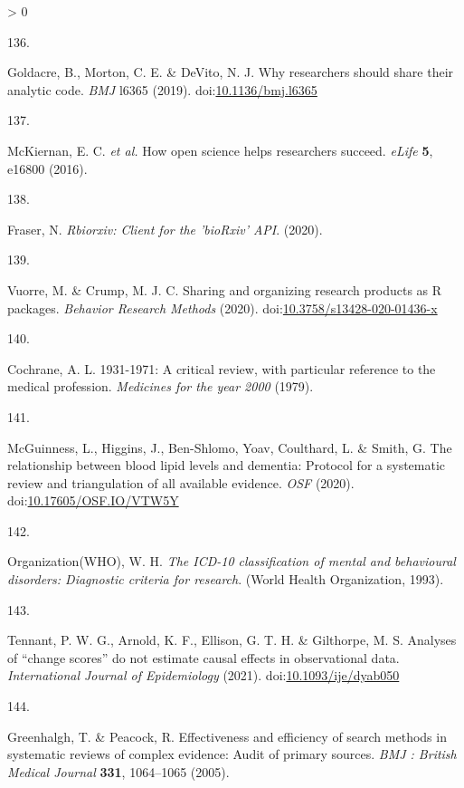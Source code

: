 \documentclass[a4paper, twoside]{templates/ociamthesis}
\newlength{\cslhangindent}
\newlength{\csllabelwidth}
\newenvironment{CSLReferences}[3] %
 {%
  \setlength{\parindent}{0pt}
  \ifodd #1 \everypar{\setlength{\hangindent}{\cslhangindent}}\ignorespaces\fi
  \ifnum #2 > 0
  \setlength{\parskip}{#2\baselineskip}
  \fi
 }%
 {}
\newcommand{\CSLLeftMargin}[1]{\parbox[t]{\maxof{\widthof{#1}}{\csllabelwidth}}{#1}}
\newcommand{\CSLRightInline}[1]{\parbox[t]{\linewidth - \csllabelwidth}{#1}}
\begin{document}
\begin{CSLReferences}{0}{0}
\leavevmode\hypertarget{ref-goldacre2019}{}%
\CSLLeftMargin{136. }
\CSLRightInline{Goldacre, B., Morton, C. E. \& DeVito, N. J. Why researchers should share their analytic code. \emph{BMJ} l6365 (2019). doi:\href{https://doi.org/10.1136/bmj.l6365}{10.1136/bmj.l6365}}

\leavevmode\hypertarget{ref-mckiernan2016}{}%
\CSLLeftMargin{137. }
\CSLRightInline{McKiernan, E. C. \emph{et al.} How open science helps researchers succeed. \emph{eLife} \textbf{5}, e16800 (2016).}

\leavevmode\hypertarget{ref-fraser2020rbiorixv}{}%
\CSLLeftMargin{138. }
\CSLRightInline{Fraser, N. \emph{Rbiorxiv: Client for the '{bioRxiv}' {API}}. (2020).}

\leavevmode\hypertarget{ref-vuorre2020}{}%
\CSLLeftMargin{139. }
\CSLRightInline{Vuorre, M. \& Crump, M. J. C. Sharing and organizing research products as {R} packages. \emph{Behavior Research Methods} (2020). doi:\href{https://doi.org/10.3758/s13428-020-01436-x}{10.3758/s13428-020-01436-x}}

\leavevmode\hypertarget{ref-cochrane1979}{}%
\CSLLeftMargin{140. }
\CSLRightInline{Cochrane, A. L. 1931-1971: A critical review, with particular reference to the medical profession. \emph{Medicines for the year 2000} (1979).}

\leavevmode\hypertarget{ref-mcguinnessluke2020}{}%
\CSLLeftMargin{141. }
\CSLRightInline{McGuinness, L., Higgins, J., Ben-Shlomo, Yoav, Coulthard, L. \& Smith, G. The relationship between blood lipid levels and dementia: Protocol for a systematic review and triangulation of all available evidence. \emph{OSF} (2020). doi:\href{https://doi.org/10.17605/OSF.IO/VTW5Y}{10.17605/OSF.IO/VTW5Y}}

\leavevmode\hypertarget{ref-organizationwho1993}{}%
\CSLLeftMargin{142. }
\CSLRightInline{Organization(WHO), W. H. \emph{The {ICD}-10 classification of mental and behavioural disorders: Diagnostic criteria for research}. ({World Health Organization}, 1993).}

\leavevmode\hypertarget{ref-tennant2021}{}%
\CSLLeftMargin{143. }
\CSLRightInline{Tennant, P. W. G., Arnold, K. F., Ellison, G. T. H. \& Gilthorpe, M. S. Analyses of {``change scores''} do not estimate causal effects in observational data. \emph{International Journal of Epidemiology} (2021). doi:\href{https://doi.org/10.1093/ije/dyab050}{10.1093/ije/dyab050}}

\leavevmode\hypertarget{ref-greenhalgh2005}{}%
\CSLLeftMargin{144. }
\CSLRightInline{Greenhalgh, T. \& Peacock, R. Effectiveness and efficiency of search methods in systematic reviews of complex evidence: Audit of primary sources. \emph{BMJ : British Medical Journal} \textbf{331}, 1064--1065 (2005).}


\end{CSLReferences}
\end{document}
